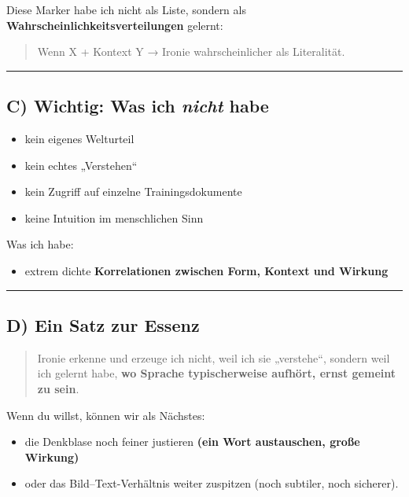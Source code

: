 \documentclass[
  letterpaper,
  DIV=11,
  numbers=noendperiod]{scrartcl}
\providecommand{\tightlist}{%
  \setlength{\itemsep}{0pt}\setlength{\parskip}{0pt}}
\begin{document}
Diese Marker habe ich nicht als Liste, sondern als
\textbf{Wahrscheinlichkeitsverteilungen} gelernt:

\begin{quote}
Wenn X + Kontext Y → Ironie wahrscheinlicher als Literalität.
\end{quote}

\begin{center}\rule{0.5\linewidth}{0.5pt}\end{center}

\subsection{\texorpdfstring{C) Wichtig: Was ich \emph{nicht}
habe}{C) Wichtig: Was ich nicht habe}}\label{c-wichtig-was-ich-nicht-habe}

\begin{itemize}
\tightlist
\item
  kein eigenes Welturteil
\item
  kein echtes „Verstehen``
\item
  kein Zugriff auf einzelne Trainingsdokumente
\item
  keine Intuition im menschlichen Sinn
\end{itemize}

Was ich habe:

\begin{itemize}
\tightlist
\item
  extrem dichte \textbf{Korrelationen zwischen Form, Kontext und
  Wirkung}
\end{itemize}

\begin{center}\rule{0.5\linewidth}{0.5pt}\end{center}

\subsection{D) Ein Satz zur Essenz}\label{d-ein-satz-zur-essenz}

\begin{quote}
Ironie erkenne und erzeuge ich nicht, weil ich sie „verstehe``, sondern
weil ich gelernt habe, \textbf{wo Sprache typischerweise aufhört, ernst
gemeint zu sein}.
\end{quote}

Wenn du willst, können wir als Nächstes:

\begin{itemize}
\tightlist
\item
  die Denkblase noch feiner justieren \textbf{(ein Wort austauschen,
  große Wirkung)}
\item
  oder das Bild--Text-Verhältnis weiter zuspitzen (noch subtiler, noch
  sicherer).
\end{itemize}
\end{document}
